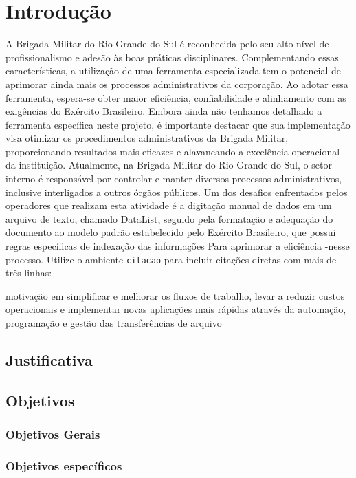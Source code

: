 \chapter{Introdução}
A Brigada Militar do Rio Grande do Sul é reconhecida pelo seu alto nível de profissionalismo e 
adesão às boas práticas disciplinares.
Complementando essas características, a utilização de uma ferramenta especializada tem o potencial de 
aprimorar ainda mais os processos administrativos da corporação.
Ao adotar essa ferramenta, espera-se obter maior eficiência, confiabilidade e alinhamento com as 
exigências do Exército Brasileiro. Embora ainda não tenhamos detalhado a ferramenta específica neste projeto,
é importante destacar que sua implementação visa otimizar os procedimentos administrativos da Brigada Militar, 
proporcionando resultados mais eficazes e alavancando a excelência operacional da instituição.
Atualmente, na Brigada Militar do Rio Grande do Sul, o setor interno é responsável por controlar e 
manter diversos processos administrativos, inclusive interligados a outros órgãos públicos. 
Um dos desafios enfrentados pelos operadores que realizam esta atividade é a digitação manual de dados em um 
arquivo de texto, chamado DataList, seguido pela formatação e adequação do documento ao modelo padrão 
estabelecido pelo Exército Brasileiro, que possui regras específicas de indexação das informações
Para aprimorar a eficiência -nesse processo.
Utilize o ambiente \texttt{citacao} para incluir
citações diretas com mais de três linhas:
\begin{citacao}
motivação em simplificar e melhorar os fluxos de trabalho, levar a reduzir custos operacionais e implementar novas aplicações mais rápidas através da automação, programação e gestão das transferências de arquivo\cite[5.3]{AndradeJunior}
\end{citacao}


\section{Justificativa}

\section{Objetivos}

\subsection{Objetivos Gerais}

\subsection{Objetivos específicos}
